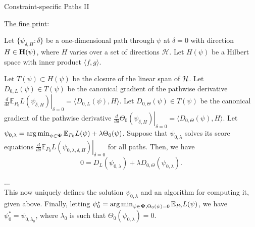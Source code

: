 \documentclass[12pt,t]{beamer}
\newcommand{\E}{\mathbb{E}}
\DeclareMathOperator*{\argmin}{arg\,min}
\begin{document}
\begin{frame}[c]{Constraint-specific Paths II}

\begin{center}
\underline{The fine print}:

\scriptsize{
\begin{theorem}
Let $\{\psi_{\delta, H}: \delta \}$ be a one-dimensional path through $\psi$ at
$\delta = 0$ with direction $H \in {\bf H}(\psi)$, where $H$ varies over a set
of directions $\mathcal{H}$. Let $H(\psi)$ be a Hilbert space with inner product
$\langle f, g \rangle$.

\vspace{1em}

Let $T(\psi) \subset H(\psi)$ be the closure of the linear span of ${\cal H}$.
Let $D_{0, L}(\psi) \in T(\psi)$ be the canonical gradient of the pathwise
derivative $\left . \frac{d}{d \delta} \E_{P_0}L(\psi_{\delta, H}) \right
|_{\delta = 0} = \langle D_{0, L}(\psi), H \rangle$. Let $D_{0, \Theta}(\psi)
\in T(\psi)$ be the canonical gradient of the pathwise derivative $\left .
 \frac{d}{d \delta}\Theta_0(\psi_{\delta, H}) \right |_{\delta = 0} =
 \langle D_{0, \Theta}(\psi), H \rangle$. Let
$\psi_{0, \lambda} = \argmin_{\psi \in {\bf \Psi}} \E_{P_0}L(\psi) + \lambda
\Theta_0(\psi)$. Suppose that $\psi_{0, \lambda}$ solves its score equations
$\left . \frac{d}{d \delta} \E_{P_0}L(\psi_{0, \lambda, \delta, H}) \right
|_{\delta = 0}$ for all paths. Then, we have
\begin{equation}\label{lfmpathconditiona}
0 = D_L(\psi_{0, \lambda}) + \lambda D_{0, \Theta}(\psi_{0, \lambda}).
\end{equation}

$\dots$\\

This now uniquely defines the solution $\psi_{0, \lambda}$ and an algorithm for
computing it, given above. Finally, letting $\psi_0^* = \argmin_{\psi \in {\bf
\Psi}, \Theta_0(\psi) = 0} \E_{P_0}L(\psi)$, we have $\psi_0^* = \psi_{0,
 \lambda_0}$, where $\lambda_0$ is such that $\Theta_0(\psi_{0, \lambda}) = 0$.
\end{theorem}
}

\end{center}

\note{
}

\end{frame}

\end{document}
